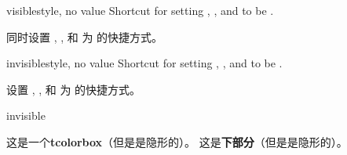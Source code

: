 \begin{docTcbKey}[][doc new and updated={2015-01-06}{2019-03-01}]{visible}{}{style, no value}
Shortcut for setting , , and 
to be .

同时设置 , , 和  为  的快捷方式。
\end{docTcbKey}

\begin{docTcbKey}[][doc new and updated={2015-01-06}{2019-03-01}]{invisible}{}{style, no value}
Shortcut for setting , , and 
to be .

设置 , , 和  为  的快捷方式。
\begin{exdispExample}{invisible}
\begin{tcolorbox}[invisible]
这是一个\textbf{tcolorbox}（但是是隐形的）。
\tcblower
这是\textbf{下部分}（但是是隐形的）。
\end{tcolorbox}
\end{exdispExample}
\end{docTcbKey}




